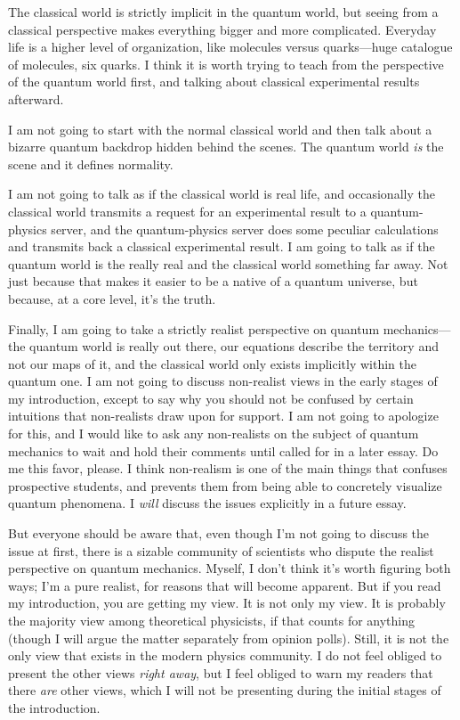 {
 The classical world is strictly implicit in the quantum world, but
seeing from a classical perspective makes everything bigger and more
complicated. Everyday life is a higher level of organization, like
molecules versus quarks---huge catalogue of molecules, six quarks. I
think it is worth trying to teach from the perspective of the quantum
world first, and talking about classical experimental results
afterward.}

{
 I am not going to start with the normal classical world and then
talk about a bizarre quantum backdrop hidden behind the scenes. The
quantum world \textit{is} the scene and it defines normality.}

{
 I am not going to talk as if the classical world is real life, and
occasionally the classical world transmits a request for an
experimental result to a quantum-physics server, and the
quantum-physics server does some peculiar calculations and transmits
back a classical experimental result. I am going to talk as if the
quantum world is the really real and the classical world something far
away. Not just because that makes it easier to be a native of a quantum
universe, but because, at a core level, it's the
truth.}

{
 Finally, I am going to take a strictly realist perspective on
quantum mechanics---the quantum world is really out there, our
equations describe the territory and not our maps of it, and the
classical world only exists implicitly within the quantum one. I am not
going to discuss non-realist views in the early stages of my
introduction, except to say why you should not be confused by certain
intuitions that non-realists draw upon for support. I am not going to
apologize for this, and I would like to ask any non-realists on the
subject of quantum mechanics to wait and hold their comments until
called for in a later essay. Do me this favor, please. I think
non-realism is one of the main things that confuses prospective
students, and prevents them from being able to concretely visualize
quantum phenomena. I \textit{will} discuss the issues explicitly in a
future essay.}

{
 But everyone should be aware that, even though I'm
not going to discuss the issue at first, there is a sizable community
of scientists who dispute the realist perspective on quantum mechanics.
Myself, I don't think it's worth
figuring both ways; I'm a pure realist, for reasons
that will become apparent. But if you read my introduction, you are
getting my view. It is not only my view. It is probably the majority
view among theoretical physicists, if that counts for anything (though
I will argue the matter separately from opinion polls). Still, it is
not the only view that exists in the modern physics community. I do not
feel obliged to present the other views \textit{right away}, but I feel
obliged to warn my readers that there \textit{are} other views, which I
will not be presenting during the initial stages of the introduction.}

